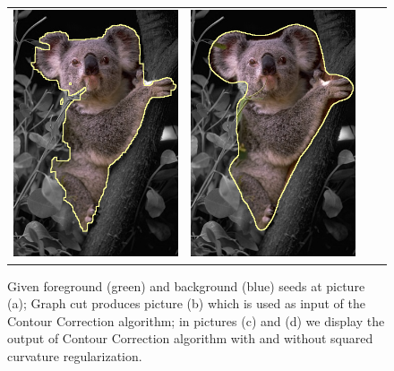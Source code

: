 \begin{figure}
\begin{tabular}{cccc}
 	\includegraphics[scale=0.25]{figures/chapter6/segmentation/coala/mt_improve/radius_5/data_0.50/sq_0.00/length_0.50/it_50/corrected-seg.png} & 
 	\includegraphics[scale=0.25]{figures/chapter6/segmentation/coala/mt_improve/radius_5/data_0.50/sq_1.00/length_0.50/it_50/corrected-seg.png}
\end{tabular}	
\caption{Given foreground (green) and background (blue) seeds at picture (a); Graph cut produces picture (b) which is used as input of the Contour Correction algorithm; in pictures (c) and (d) we display the output of Contour Correction algorithm with and without squared curvature regularization. }
\label{ch6:fig:segmentation}
\end{figure}

